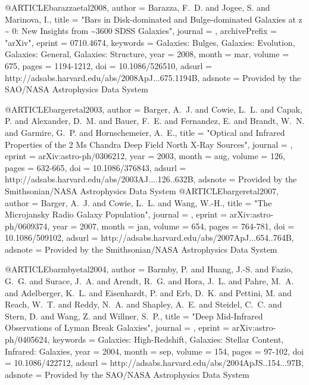 {{{@ARTICLE{barazzaetal2008,
   author = {{Barazza}, F.~D. and {Jogee}, S. and {Marinova}, I.},
    title = "{Bars in Disk-dominated and Bulge-dominated Galaxies at z \~{} 0: New Insights from \~{}3600 SDSS Galaxies}",
  journal = {\apj},
archivePrefix = "arXiv",
   eprint = {0710.4674},
 keywords = {Galaxies: Bulges, Galaxies: Evolution, Galaxies: General, Galaxies: Structure},
     year = 2008,
    month = mar,
   volume = 675,
    pages = {1194-1212},
      doi = {10.1086/526510},
   adsurl = {http://adsabs.harvard.edu/abs/2008ApJ...675.1194B},
  adsnote = {Provided by the SAO/NASA Astrophysics Data System}
}



@ARTICLE{bargeretal2003,
   author = {{Barger}, A.~J. and {Cowie}, L.~L. and {Capak}, P. and {Alexander}, D.~M. and 
	{Bauer}, F.~E. and {Fernandez}, E. and {Brandt}, W.~N. and {Garmire}, G.~P. and 
	{Hornschemeier}, A.~E.},
    title = "{Optical and Infrared Properties of the 2 Ms Chandra Deep Field North X-Ray Sources}",
  journal = {\aj},
   eprint = {arXiv:astro-ph/0306212},
     year = 2003,
    month = aug,
   volume = 126,
    pages = {632-665},
      doi = {10.1086/376843},
   adsurl = {http://adsabs.harvard.edu/abs/2003AJ....126..632B},
  adsnote = {Provided by the Smithsonian/NASA Astrophysics Data System}
}
@ARTICLE{bargeretal2007,
   author = {{Barger}, A.~J. and {Cowie}, L.~L. and {Wang}, W.-H.},
    title = "{The Microjansky Radio Galaxy Population}",
  journal = {\apj},
   eprint = {arXiv:astro-ph/0609374},
     year = 2007,
    month = jan,
   volume = 654,
    pages = {764-781},
      doi = {10.1086/509102},
   adsurl = {http://adsabs.harvard.edu/abs/2007ApJ...654..764B},
  adsnote = {Provided by the Smithsonian/NASA Astrophysics Data System}
}

@ARTICLE{barmbyetal2004,
   author = {{Barmby}, P. and {Huang}, J.-S. and {Fazio}, G.~G. and {Surace}, J.~A. and 
	{Arendt}, R.~G. and {Hora}, J.~L. and {Pahre}, M.~A. and {Adelberger}, K.~L. and 
	{Eisenhardt}, P. and {Erb}, D.~K. and {Pettini}, M. and {Reach}, W.~T. and 
	{Reddy}, N.~A. and {Shapley}, A.~E. and {Steidel}, C.~C. and 
	{Stern}, D. and {Wang}, Z. and {Willner}, S.~P.},
    title = "{Deep Mid-Infrared Observations of Lyman Break Galaxies}",
  journal = {\apjs},
   eprint = {arXiv:astro-ph/0405624},
 keywords = {Galaxies: High-Redshift, Galaxies: Stellar Content, Infrared: Galaxies},
     year = 2004,
    month = sep,
   volume = 154,
    pages = {97-102},
      doi = {10.1086/422712},
   adsurl = {http://adsabs.harvard.edu/abs/2004ApJS..154...97B},
  adsnote = {Provided by the SAO/NASA Astrophysics Data System}
}


}}}
